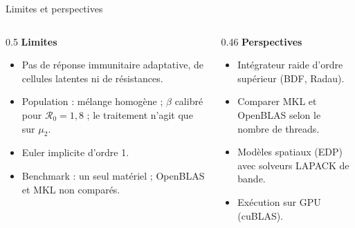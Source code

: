 \documentclass[aspectratio=169,11pt,t]{beamer}
\newcommand{\Rzero}{\mathcal{R}_0}
\begin{document}
\begin{frame}{Limites et perspectives}
    \begin{columns}[T,onlytextwidth]
        \begin{column}{0.5\textwidth}
            \textbf{\color{navy}Limites}
            \medskip
            \begin{itemize}
                \item Pas de réponse immunitaire adaptative, de cellules latentes ni de résistances.
                \item Population : mélange homogène ; $\beta$ calibré pour $\Rzero=1{,}8$ ; le traitement n'agit que sur $\mu_2$.
                \item Euler implicite d'ordre 1.
                \item Benchmark : un seul matériel ; OpenBLAS et MKL non comparés.
            \end{itemize}
        \end{column}
        \begin{column}{0.46\textwidth}
            \textbf{\color{navy}Perspectives}
            \medskip
            \begin{itemize}
                \item Intégrateur raide d'ordre supérieur (BDF, Radau).
                \item Comparer MKL et OpenBLAS selon le nombre de threads.
                \item Modèles spatiaux (EDP) avec solveurs LAPACK de bande.
                \item Exécution sur GPU (cuBLAS).
            \end{itemize}
        \end{column}
    \end{columns}
\end{frame}

\begin{frame}[plain]
\end{frame}
\end{document}
